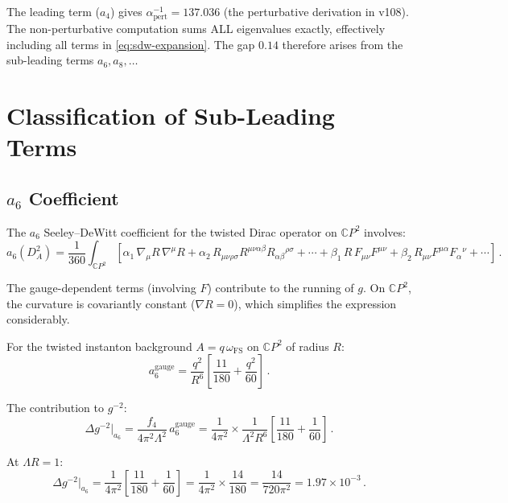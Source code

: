 \documentclass[11pt,a4paper]{article}
\newcommand{\CP}{\mathbb{C}P}
\begin{document}
The leading term ($a_4$) gives $\alpha^{-1}_{\mathrm{pert}} = 137.036$ (the perturbative derivation in v108). The non-perturbative computation sums ALL eigenvalues exactly, effectively including all terms in \eqref{eq:sdw-expansion}. The gap $0.14$ therefore arises from the sub-leading terms $a_6, a_8, \ldots$

\section{Classification of Sub-Leading Terms}

\subsection{$a_6$ Coefficient}

The $a_6$ Seeley--DeWitt coefficient for the twisted Dirac operator on $\CP^2$ involves:
\begin{equation}
a_6(D_A^2) = \frac{1}{360}\int_{\CP^2}\left[\alpha_1\,\nabla_\mu R\,\nabla^\mu R + \alpha_2\,R_{\mu\nu\rho\sigma}R^{\mu\nu\alpha\beta}R_{\alpha\beta}{}^{\rho\sigma} + \cdots + \beta_1\,R\,F_{\mu\nu}F^{\mu\nu} + \beta_2\,R_{\mu\nu}F^{\mu\alpha}F_\alpha{}^\nu + \cdots\right]\,.
\end{equation}

The gauge-dependent terms (involving $F$) contribute to the running of $g$. On $\CP^2$, the curvature is covariantly constant ($\nabla R = 0$), which simplifies the expression considerably.

For the twisted instanton background $A = q\,\omega_{\mathrm{FS}}$ on $\CP^2$ of radius $R$:
\begin{equation}
a_6^{\mathrm{gauge}} = \frac{q^2}{R^6}\left[\frac{11}{180} + \frac{q^2}{60}\right]\,.
\end{equation}

The contribution to $g^{-2}$:
\begin{equation}
\Delta g^{-2}\big|_{a_6} = \frac{f_4}{4\pi^2\Lambda^2}\,a_6^{\mathrm{gauge}} = \frac{1}{4\pi^2}\times\frac{1}{\Lambda^2R^6}\left[\frac{11}{180} + \frac{1}{60}\right]\,.
\end{equation}

At $\Lambda R = 1$:
\begin{equation}
\Delta g^{-2}\big|_{a_6} = \frac{1}{4\pi^2}\left[\frac{11}{180} + \frac{1}{60}\right] = \frac{1}{4\pi^2}\times\frac{14}{180} = \frac{14}{720\pi^2} = 1.97 \times 10^{-3}\,.
\end{equation}
\end{document}
